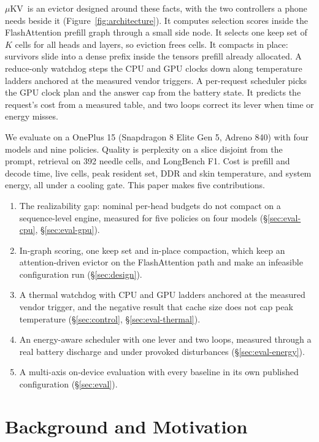 \documentclass[sigconf, anonymous=false, screen=true]{acmart}
\newcommand{\muKV}{$\mu$KV}
\begin{document}
\muKV\ is an evictor designed around these facts, with the two controllers a phone needs beside it (Figure~\ref{fig:architecture}). It computes selection scores inside the FlashAttention prefill graph through a small side node. It selects one keep set of $K$ cells for all heads and layers, so eviction frees cells. It compacts in place: survivors slide into a dense prefix inside the tensors prefill already allocated. A reduce-only watchdog steps the CPU and GPU clocks down along temperature ladders anchored at the measured vendor triggers. A per-request scheduler picks the GPU clock plan and the answer cap from the battery state. It predicts the request's cost from a measured table, and two loops correct its lever when time or energy misses.

We evaluate on a OnePlus 15 (Snapdragon 8 Elite Gen 5, Adreno 840) with four models and nine policies. Quality is perplexity on a slice disjoint from the prompt, retrieval on 392 needle cells, and LongBench F1. Cost is prefill and decode time, live cells, peak resident set, DDR and skin temperature, and system energy, all under a cooling gate. This paper makes five contributions.

\begin{enumerate}[label=(\roman*), leftmargin=*, itemsep=1pt]
\item The realizability gap: nominal per-head budgets do not compact on a sequence-level engine, measured for five policies on four models (\S\ref{sec:eval-cpu}, \S\ref{sec:eval-gpu}).
\item In-graph scoring, one keep set and in-place compaction, which keep an attention-driven evictor on the FlashAttention path and make an infeasible configuration run (\S\ref{sec:design}).
\item A thermal watchdog with CPU and GPU ladders anchored at the measured vendor trigger, and the negative result that cache size does not cap peak temperature (\S\ref{sec:control}, \S\ref{sec:eval-thermal}).
\item An energy-aware scheduler with one lever and two loops, measured through a real battery discharge and under provoked disturbances (\S\ref{sec:eval-energy}).
\item A multi-axis on-device evaluation with every baseline in its own published configuration (\S\ref{sec:eval}).
\end{enumerate}

\section{Background and Motivation}
\label{sec:bg}
\end{document}
